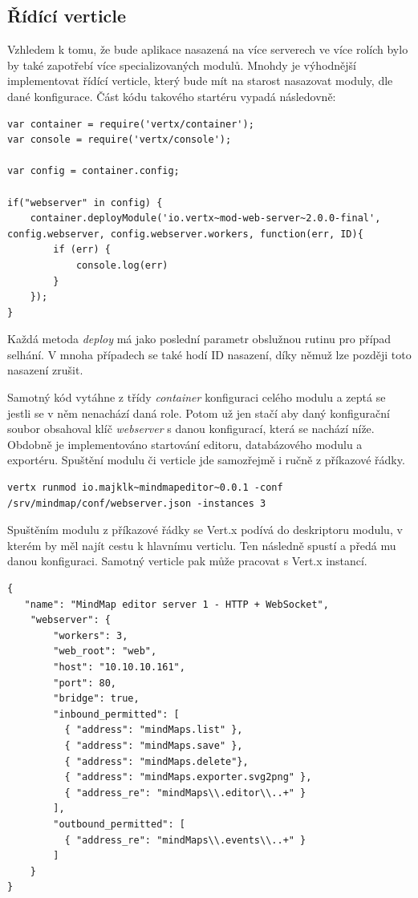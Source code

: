 \subsection{Řídící verticle}

Vzhledem k tomu, že bude aplikace nasazená na více serverech ve více rolích bylo by také zapotřebí více specializovaných modulů. Mnohdy je výhodnější implementovat řídící verticle, který bude mít na starost nasazovat moduly, dle dané konfigurace. Část kódu takového startéru vypadá následovně:

\begin{lstlisting}
var container = require('vertx/container');
var console = require('vertx/console');

var config = container.config;

if("webserver" in config) {
	container.deployModule('io.vertx~mod-web-server~2.0.0-final', config.webserver, config.webserver.workers, function(err, ID){
		if (err) {
			console.log(err)
		}
	});
}
\end{lstlisting}

Každá metoda \emph{deploy} má jako poslední parametr obslužnou rutinu pro případ selhání. V mnoha případech se také hodí ID nasazení, díky němuž lze později toto nasazení zrušit.

Samotný kód vytáhne z třídy \emph{container} konfiguraci celého modulu a zeptá se jestli se v něm nenachází daná role. Potom už jen stačí aby daný konfigurační soubor obsahoval klíč \emph{webserver} s danou konfigurací, která se nachází níže. Obdobně je implementováno startování editoru, databázového modulu a exportéru. Spuštění modulu či verticle jde samozřejmě i ručně z příkazové řádky.

\begin{lstlisting}[caption=Spuštění modulu z příkazové řádky]
vertx runmod io.majklk~mindmapeditor~0.0.1 -conf /srv/mindmap/conf/webserver.json -instances 3
\end{lstlisting}

Spuštěním modulu z příkazové řádky se Vert.x podívá do deskriptoru modulu, v kterém by měl najít cestu k hlavnímu verticlu. Ten následně spustí a předá mu danou konfiguraci. Samotný verticle pak může pracovat s Vert.x instancí.

\begin{lstlisting}[caption=Konfigurace serveru 1]
{
   "name": "MindMap editor server 1 - HTTP + WebSocket",
    "webserver": {
        "workers": 3,
        "web_root": "web",
        "host": "10.10.10.161",
        "port": 80,
        "bridge": true,
        "inbound_permitted": [
          { "address": "mindMaps.list" },
          { "address": "mindMaps.save" },
          { "address": "mindMaps.delete"},
          { "address": "mindMaps.exporter.svg2png" },
          { "address_re": "mindMaps\\.editor\\..+" }
        ],
        "outbound_permitted": [
          { "address_re": "mindMaps\\.events\\..+" }
        ]
    }
}
\end{lstlisting}

